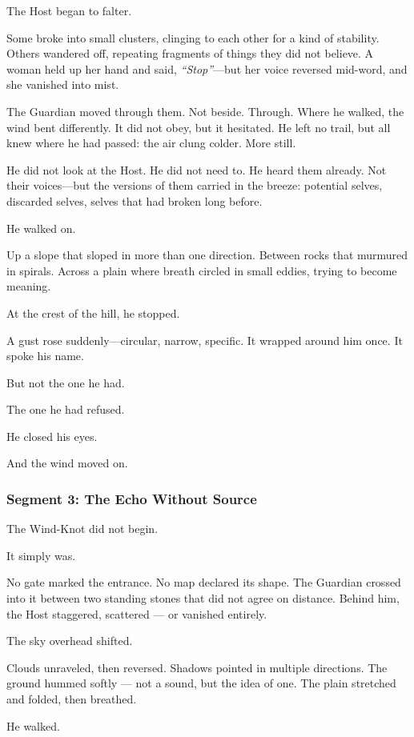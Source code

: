 \documentclass[9pt]{article}
\begin{document}
The Host began to falter.

Some broke into small clusters, clinging to each other for a kind of stability. Others wandered off, repeating fragments of things they did not believe. A woman held up her hand and said, \textit{``Stop''}—but her voice reversed mid-word, and she vanished into mist.

The Guardian moved through them. Not beside. Through. Where he walked, the wind bent differently. It did not obey, but it hesitated. He left no trail, but all knew where he had passed: the air clung colder. More still.

He did not look at the Host. He did not need to. He heard them already. Not their voices—but the versions of them carried in the breeze: potential selves, discarded selves, selves that had broken long before.

He walked on.

Up a slope that sloped in more than one direction. Between rocks that murmured in spirals. Across a plain where breath circled in small eddies, trying to become meaning.

At the crest of the hill, he stopped.

A gust rose suddenly—circular, narrow, specific. It wrapped around him once. It spoke his name.

But not the one he had.

The one he had refused.

He closed his eyes.

And the wind moved on.

\newpage

\subsubsection*{Segment 3: The Echo Without Source}

The Wind-Knot did not begin.

It simply was.

No gate marked the entrance. No map declared its shape. The Guardian crossed into it between two standing stones that did not agree on distance. Behind him, the Host staggered, scattered — or vanished entirely.

The sky overhead shifted.

Clouds unraveled, then reversed. Shadows pointed in multiple directions. The ground hummed softly — not a sound, but the idea of one. The plain stretched and folded, then breathed.

He walked.
\end{document}
